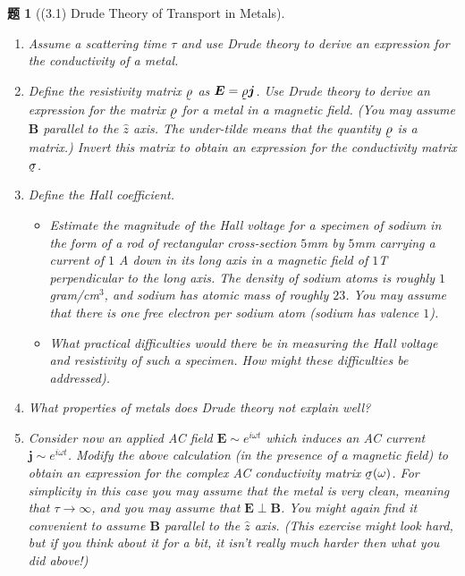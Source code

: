 \documentclass[UTF8,10pt,a4paper]{article}
\theoremstyle{Problem}
\newtheorem{prob}{题}
\theoremstyle{Solution}
\begin{document}
\begin{prob}[(3.1) Drude Theory of Transport in Metals]
    \begin{enumerate}
        \item[(a)$\ddagger$] Assume a scattering time $\tau$ and use Drude theory to derive an expression for the conductivity of a metal.
        \item[(b)] Define the resistivity matrix $\underaccent{\tilde}{\rho}$ as $\bm{E}=\underaccent{\tilde}{\rho}\bm{j}$. Use Drude theory to derive an expression for the matrix $\underaccent{\tilde}{\rho}$ for a metal in a magnetic field. (You may assume $\bm{B}$ parallel to the $\hat{z}$ axis. The under-tilde means that the quantity $\underaccent{\tilde}{\rho}$ is a matrix.) Invert this matrix to obtain an expression for the conductivity matrix $\underaccent{\tilde}{\sigma}$.
        \item[(c)] Define the Hall coefficient.
        \begin{itemize}
            \item[$\triangleright$] Estimate the magnitude of the Hall voltage for a specimen of sodium in the form of a rod of rectangular cross-section $5$mm by $5$mm carrying a current of $1$ A down in its long axis in a magnetic field of $1$T perpendicular to the long axis. The density of sodium atoms is roughly $1$ gram/cm$^3$, and sodium has atomic mass of roughly $23$. You may assume that there is one free electron per sodium atom (sodium has valence $1$).
            \item[$\triangleright$] What practical difficulties would there be in measuring the Hall voltage and resistivity of such a specimen. How might these difficulties be addressed).
        \end{itemize}
        \item[(d)] What properties of metals does Drude theory not explain well?
        \item[(e)$^*$] Consider now an applied AC field $\bm{E}\sim e^{i\omega t}$ which induces an AC current $\bm{j}\sim e^{i\omega t}$. Modify the above calculation (in the presence of a magnetic field) to obtain an expression for the complex AC conductivity matrix $\underaccent{\tilde}{\sigma}(\omega)$. For simplicity in this case you may assume that the metal is very clean, meaning that $\tau\rightarrow\infty$, and you may assume that $\bm{E}\perp\bm{B}$. You might again find it convenient to assume $\bm{B}$ parallel to the $\hat{z}$ axis. (This exercise might look hard, but if you think about it for a bit, it isn't really much harder then what you did above!)

\end{enumerate}
\end{prob}
\end{document}
